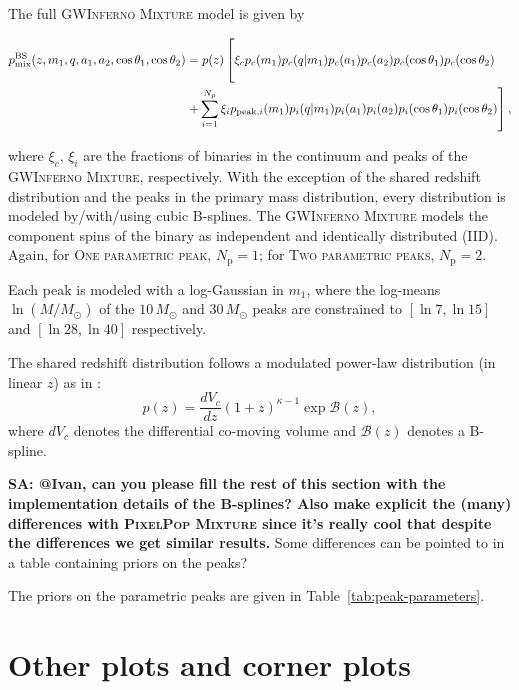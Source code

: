 \documentclass[twocolumn,twocolappendix,linenumbers]{aastex631}
\newcommand{\sa}[1]{{\bf\color{Thistle}SA: #1}}
\renewcommand{\ij}[1]{{\color{Green} #1}}
\newcommand{\PPMixture}{\textsc{PixelPop Mixture}\xspace}
\newcommand{\GwinfMixture}{\textsc{GWInferno Mixture}\xspace}
\newcommand{\oneparpeak}{\textsc{One parametric peak}\xspace}
\newcommand{\twoparpeaks}{\textsc{Two parametric peaks}\xspace}
\begin{document}
The full \GwinfMixture model is given by
\begin{widetext}
\begin{equation}\label{eq:bspline-mixture}
\begin{aligned}
    p_\mathrm{mix}^\mathrm{BS}(z,m_1,q,a_1,a_2,\cos\theta_1,\cos\theta_2)&=p(z)\left[\xi_cp_c(m_1)p_c(q|m_1)p_c(a_1)p_c(a_2)p_c(\cos\theta_1)p_c(\cos\theta_2)\vphantom{\sum_{i=1}^{N_p}}\right. \\
    &\left.+\sum_{i=1}^{N_p}\xi_ip_{\mathrm{peak},i}(m_1)p_i(q|m_1)p_i(a_1)p_i(a_2)p_i(\cos\theta_1)p_i(\cos\theta_2)\right],
\end{aligned}
\end{equation}
\end{widetext}
where \(\xi_c,\,\xi_i\) are the fractions of binaries in the continuum and peaks of the \GwinfMixture, respectively.
With the exception of the shared redshift distribution and the peaks in the primary mass distribution, every distribution is modeled \ij{by/with/using} cubic B-splines.
The \GwinfMixture models the component spins of the binary as independent and identically distributed (IID).
\ij{Again}, for \oneparpeak, \(N_\mathrm{p}=1\); for \twoparpeaks, \(N_\mathrm{p}=2\).

Each peak is modeled with a log-Gaussian in \(m_1\), where the log-means \(\ln(M/M_\odot)\) of the \(10\,M_\odot\) and \(30\,M_\odot\) peaks are constrained to \([\ln7,\ln15]\) and \([\ln28,\ln40]\) respectively.

The shared redshift distribution follows a modulated power-law distribution (in linear \(z\)) as in \cite{Edelman:2022ydv}:
\[
p(z)=\frac{dV_c}{dz}(1+z)^{\kappa-1}\exp\mathcal{B}(z),
\]
where \(dV_c\) denotes the differential co-moving volume and \(\mathcal{B}(z)\) denotes a B-spline.

\sa{@Ivan, can you please fill the rest of this section with the implementation details of the B-splines? Also make explicit the (many) differences with \PPMixture since it's really cool that despite the differences we get similar results.} 
\ij{Some differences can be pointed to in a table containing priors on the peaks?}


The priors on the parametric peaks are given in Table~\ref{tab:peak-parameters}.

\section{Other plots and corner plots}
\end{document}
